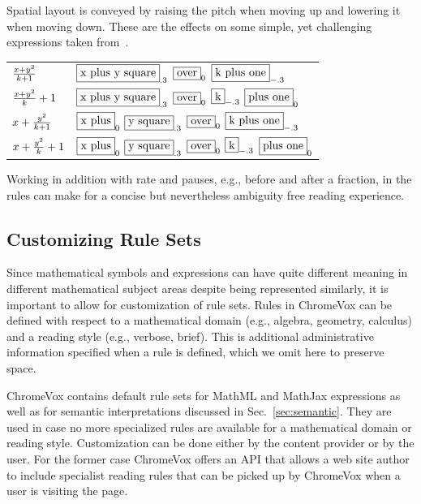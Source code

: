 \documentclass{sig-alternate}
\begin{document}
\noindent 
Spatial layout is conveyed by raising the pitch when moving up and lowering it
when moving down. These are the effects on some simple, yet challenging
expressions taken from~\cite{knuthart}.
\begin{tabular}{lp{}}
  $x+y^2\over k+1$ &
  $\framebox{\text{x plus y square}}_{.3}$ 
  $\framebox{\text{over}}_{0}$ 
  $\framebox{\text{k plus one}}_{-.3}$
  \\
  ${x+y^2\over k}+1$ &
  $\framebox{\text{x plus y square}}_{.3}$
  $\framebox{\text{over}}_{0}$
  $\framebox{\text{k}}_{-.3}$
  $\framebox{\text{plus one}}_{0}$
  \\
  $x+{y^2\over k+1}$ &
  $\framebox{\text{x plus}}_{0}$
  $\framebox{\text{y square}}_{.3}$
  $\framebox{\text{over}}_{0}$
  $\framebox{\text{k plus one}}_{-.3}$
  \\
  $x+{y^2\over k}+1$ &
  $\framebox{\text{x plus}}_{0}$
  $\framebox{\text{y square}}_{.3}$
  $\framebox{\text{over}}_{0}$
  $\framebox{\text{k}}_{-.3}$
  $\framebox{\text{plus one}}_{0}$
  \\
\end{tabular}
Working in addition with rate and pauses, e.g., before and after a fraction, in
the rules can make for a concise but nevertheless ambiguity free reading
experience.


\subsection{Customizing Rule Sets}

Since mathematical symbols and expressions can have quite different meaning in
different mathematical subject areas despite being represented similarly, it is
important to allow for customization of rule sets. Rules in ChromeVox can be
defined with respect to a mathematical domain (e.g., algebra, geometry,
calculus) and a reading style (e.g., verbose, brief). This is additional
administrative information specified when a rule is defined, which we omit here
to preserve space.

ChromeVox contains default rule sets for MathML and MathJax expressions as well
as for semantic interpretations discussed in Sec.~\ref{sec:semantic}. They are
used in case no more specialized rules are available for a mathematical domain
or reading style.  Customization can be done either by the content provider or
by the user. For the former case ChromeVox offers an API that allows a web site
author to include specialist reading rules that can be picked up by ChromeVox
when a user is visiting the page.
\end{document}
